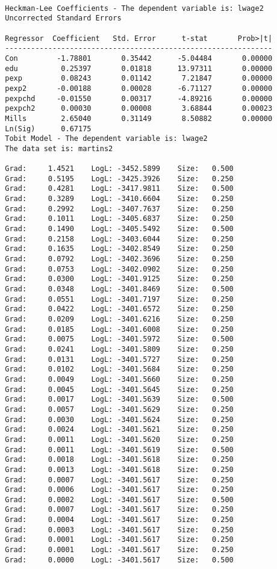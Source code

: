 \documentclass[12pt]{article}
\begin{document}
\begin{verbatim}
		
		Heckman-Lee Coefficients - The dependent variable is: lwage2
		Uncorrected Standard Errors
		
		Regressor  Coefficient	 Std. Error 	 t-stat       Prob>|t|
		--------------------------------------------------------------
		Con         -1.78801       0.35442      -5.04484       0.00000 
		edu          0.25397       0.01818      13.97311       0.00000 
		pexp         0.08243       0.01142       7.21847       0.00000 
		pexp2       -0.00188       0.00028      -6.71127       0.00000 
		pexpchd     -0.01550       0.00317      -4.89216       0.00000 
		pexpch2      0.00030       0.00008       3.68844       0.00023 
		Mills        2.65040       0.31149       8.50882       0.00000 
		Ln(Sig)      0.67175
		Tobit Model - The dependent variable is: lwage2
		The data set is: martins2
		
		Grad:     1.4521    LogL: -3452.5899    Size:   0.500
		Grad:     0.5195    LogL: -3425.3926    Size:   0.250
		Grad:     0.4281    LogL: -3417.9811    Size:   0.500
		Grad:     0.3289    LogL: -3410.6604    Size:   0.250
		Grad:     0.2992    LogL: -3407.7637    Size:   0.250
		Grad:     0.1011    LogL: -3405.6837    Size:   0.250
		Grad:     0.1490    LogL: -3405.5492    Size:   0.500
		Grad:     0.2158    LogL: -3403.6044    Size:   0.250
		Grad:     0.1635    LogL: -3402.8549    Size:   0.250
		Grad:     0.0792    LogL: -3402.3696    Size:   0.250
		Grad:     0.0753    LogL: -3402.0902    Size:   0.250
		Grad:     0.0300    LogL: -3401.9125    Size:   0.250
		Grad:     0.0348    LogL: -3401.8469    Size:   0.500
		Grad:     0.0551    LogL: -3401.7197    Size:   0.250
		Grad:     0.0422    LogL: -3401.6572    Size:   0.250
		Grad:     0.0209    LogL: -3401.6216    Size:   0.250
		Grad:     0.0185    LogL: -3401.6008    Size:   0.250
		Grad:     0.0075    LogL: -3401.5972    Size:   0.500
		Grad:     0.0241    LogL: -3401.5809    Size:   0.250
		Grad:     0.0131    LogL: -3401.5727    Size:   0.250
		Grad:     0.0102    LogL: -3401.5684    Size:   0.250
		Grad:     0.0049    LogL: -3401.5660    Size:   0.250
		Grad:     0.0045    LogL: -3401.5645    Size:   0.250
		Grad:     0.0017    LogL: -3401.5639    Size:   0.500
		Grad:     0.0057    LogL: -3401.5629    Size:   0.250
		Grad:     0.0030    LogL: -3401.5624    Size:   0.250
		Grad:     0.0024    LogL: -3401.5621    Size:   0.250
		Grad:     0.0011    LogL: -3401.5620    Size:   0.250
		Grad:     0.0011    LogL: -3401.5619    Size:   0.500
		Grad:     0.0018    LogL: -3401.5618    Size:   0.250
		Grad:     0.0013    LogL: -3401.5618    Size:   0.250
		Grad:     0.0007    LogL: -3401.5617    Size:   0.250
		Grad:     0.0006    LogL: -3401.5617    Size:   0.250
		Grad:     0.0002    LogL: -3401.5617    Size:   0.500
		Grad:     0.0007    LogL: -3401.5617    Size:   0.250
		Grad:     0.0004    LogL: -3401.5617    Size:   0.250
		Grad:     0.0003    LogL: -3401.5617    Size:   0.250
		Grad:     0.0001    LogL: -3401.5617    Size:   0.250
		Grad:     0.0001    LogL: -3401.5617    Size:   0.250
		Grad:     0.0000    LogL: -3401.5617    Size:   0.500
		

\end{verbatim}
\end{document}
